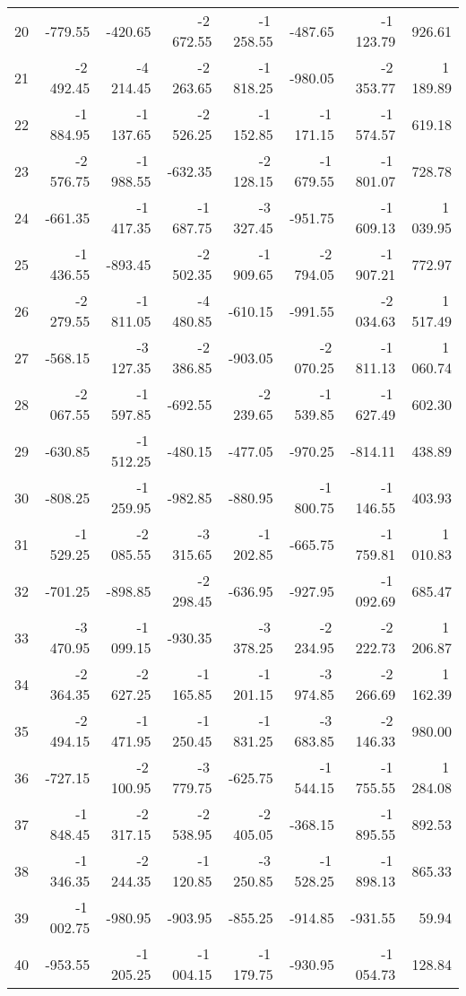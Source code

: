 \begin{longtable}{rrrrrrrr}
20 & -779.55 & -420.65 & -2\,672.55 & -1\,258.55 & -487.65 & -1\,123.79 & 926.61  \\
21 & -2\,492.45 & -4\,214.45 & -2\,263.65 & -1\,818.25 & -980.05 & -2\,353.77 & 1\,189.89  \\
22 & -1\,884.95 & -1\,137.65 & -2\,526.25 & -1\,152.85 & -1\,171.15 & -1\,574.57 & 619.18  \\
23 & -2\,576.75 & -1\,988.55 & -632.35 & -2\,128.15 & -1\,679.55 & -1\,801.07 & 728.78  \\
24 & -661.35 & -1\,417.35 & -1\,687.75 & -3\,327.45 & -951.75 & -1\,609.13 & 1\,039.95  \\
25 & -1\,436.55 & -893.45 & -2\,502.35 & -1\,909.65 & -2\,794.05 & -1\,907.21 & 772.97  \\
26 & -2\,279.55 & -1\,811.05 & -4\,480.85 & -610.15 & -991.55 & -2\,034.63 & 1\,517.49  \\
27 & -568.15 & -3\,127.35 & -2\,386.85 & -903.05 & -2\,070.25 & -1\,811.13 & 1\,060.74  \\
28 & -2\,067.55 & -1\,597.85 & -692.55 & -2\,239.65 & -1\,539.85 & -1\,627.49 & 602.30  \\
29 & -630.85 & -1\,512.25 & -480.15 & -477.05 & -970.25 & -814.11 & 438.89  \\
30 & -808.25 & -1\,259.95 & -982.85 & -880.95 & -1\,800.75 & -1\,146.55 & 403.93  \\
31 & -1\,529.25 & -2\,085.55 & -3\,315.65 & -1\,202.85 & -665.75 & -1\,759.81 & 1\,010.83  \\
32 & -701.25 & -898.85 & -2\,298.45 & -636.95 & -927.95 & -1\,092.69 & 685.47  \\
33 & -3\,470.95 & -1\,099.15 & -930.35 & -3\,378.25 & -2\,234.95 & -2\,222.73 & 1\,206.87  \\
34 & -2\,364.35 & -2\,627.25 & -1\,165.85 & -1\,201.15 & -3\,974.85 & -2\,266.69 & 1\,162.39  \\
35 & -2\,494.15 & -1\,471.95 & -1\,250.45 & -1\,831.25 & -3\,683.85 & -2\,146.33 & 980.00  \\
36 & -727.15 & -2\,100.95 & -3\,779.75 & -625.75 & -1\,544.15 & -1\,755.55 & 1\,284.08  \\
37 & -1\,848.45 & -2\,317.15 & -2\,538.95 & -2\,405.05 & -368.15 & -1\,895.55 & 892.53  \\
38 & -1\,346.35 & -2\,244.35 & -1\,120.85 & -3\,250.85 & -1\,528.25 & -1\,898.13 & 865.33  \\
39 & -1\,002.75 & -980.95 & -903.95 & -855.25 & -914.85 & -931.55 & 59.94  \\
40 & -953.55 & -1\,205.25 & -1\,004.15 & -1\,179.75 & -930.95 & -1\,054.73 & 128.84  \\

\end{longtable}
